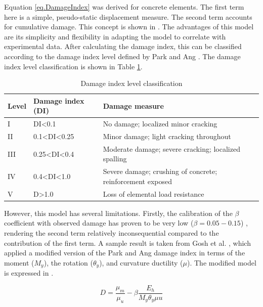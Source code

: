 Equation \ref{eq.DamageIndex} was derived for concrete elements. The first term here is a simple, pseudo-static displacement measure. The second term accounts for cumulative damage. This concept is shown in . The advantages of this model are its simplicity and flexibility in adapting the model to correlate with experimental data. After calculating the damage index, this can be classified according to the damage index level defined by Park and Ang \cite{Young-JiPark1985}. The damage index level classification is shown in Table \ref{tab:DI_Level}.
\begin{table}[htbp]
    \caption{Damage index level classification \cite{Young-JiPark1985}}
	\label{tab:DI_Level}
	\centering	
        \begin{tabular}{lll}
        \hline
        Level & Damage index (DI)               & Damage measure                                             \\ \hline
        I     & DI\textless{}0.1                & No damage; localized minor cracking                        \\
        II    & 0.1\textless{}DI\textless{}0.25 & Minor damage; light cracking throughout                    \\
        III   & 0.25\textless{}DI\textless{}0.4 & Moderate damage; severe cracking; localized spalling       \\
        IV    & 0.4\textless{}DI\textless{}1.0  & Severe damage; crushing of concrete; reinforcement exposed \\
        V     & D\textgreater{}1.0              & Loss of elemental load resistance                          \\ \hline
\end{tabular}
\end{table}

However, this model has several limitations. Firstly, the calibration of the $\beta$ coefficient with observed damage has proven to be very low ($\beta=0.05-0.15$) \cite{Young-JiPark1985} \cite{Ghosh2015}, rendering the second term relatively inconsequential compared to the contribution of the first term. A sample result is taken from Gosh et al. \cite{Ghosh2015}, which applied a modified version of the Park and Ang damage index in terms of the moment ($M_{y}$), the rotation ($\theta_y$), and curvature ductility ($\mu$). The modified model is expressed in .

\begin{equation}
	D=\frac{\mu_{m}}{\mu_{u}}-\beta\frac{E_h}{M_{y}\theta_y\mu{u}}
	\label{eq.DamageIndexGhosh}
\end{equation}


